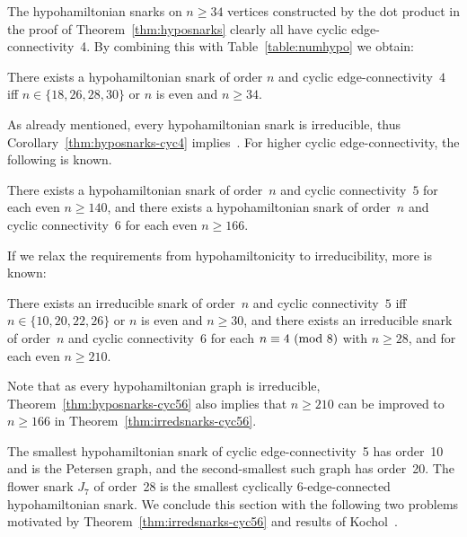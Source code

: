 \documentclass{amcjoucc}
\begin{document}
The hypohamiltonian snarks on $n \ge 34$ vertices constructed by the dot product in the proof of Theorem~\ref{thm:hyposnarks} clearly all have cyclic edge-connectivity~4. By combining this with Table~\ref{table:numhypo} we obtain:

\begin{corollary}\label{thm:hyposnarks-cyc4}
There exists a hypohamiltonian snark of order $n$ and cyclic edge-connectivity~$4$ iff $n \in \{ 18, 26, 28, 30 \}$ or $n$ is even and $n \ge 34$.
\end{corollary}

As already mentioned, every hypohamiltonian snark is irreducible, thus Corollary~\ref{thm:hyposnarks-cyc4} implies~\cite[Theorem~A]{MS06}. For higher cyclic edge-connectivity, the following is known.

\begin{theorem}\label{thm:hyposnarks-cyc56}
There exists a hypohamiltonian snark of order~$n$ and cyclic connectivity~$5$ for each even $n \ge 140$, and there exists a hypohamiltonian snark of order~$n$ and cyclic connectivity~$6$ for each even $n \ge 166$.
\end{theorem}

If we relax the requirements from hypohamiltonicity to irreducibility, more is known:

\begin{theorem}\label{thm:irredsnarks-cyc56}
There exists an irreducible snark of order~$n$ and cyclic connectivity~$5$ iff $n \in \{ 10, 20, 22, 26 \}$ or $n$ is even and $n \ge 30$, and there exists an irreducible snark of order~$n$ and cyclic connectivity~$6$ for each $n \equiv 4 \ (\textup{mod} \ 8)$ with $n \ge 28$, and for each even $n \ge 210$.
\end{theorem}

Note that as every hypohamiltonian graph is irreducible, Theorem~\ref{thm:hyposnarks-cyc56} also implies that $n \ge 210$ can be improved to $n \ge 166$ in Theorem~\ref{thm:irredsnarks-cyc56}.

The smallest hypohamiltonian snark of cyclic edge-connectivity~5 has order~10 and is the Petersen graph, and the second-smallest such graph has order~20. The flower snark $J_7$ of order~28 is the smallest cyclically 6-edge-connected hypohamiltonian snark.  We conclude this section with the following two problems motivated by Theorem~\ref{thm:irredsnarks-cyc56} and results of Kochol~\cite{Ko96-2,Ko04}.
\end{document}
